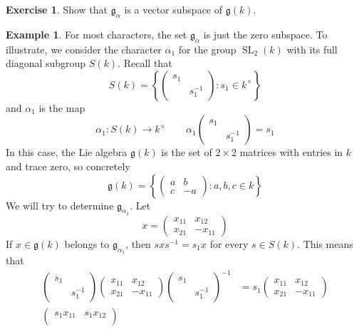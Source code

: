 \documentclass[12pt]{article}
\theoremstyle{definition}
\newtheorem{example}[theorem]{Example}
\newtheorem{exercise}[theorem]{Exercise}
\numberwithin{theorem}{subsection}
\newcommand{\lb}{\left\{}
\newcommand{\rb}{\right\}}
\newcommand{\inv}{^{-1}}
\newcommand{\frakg}{\mathfrak{g}}
\DeclareMathOperator{\SL}{SL}
\begin{document}
\begin{exercise}
Show that $\frakg_\alpha$ is a vector subspace of $\frakg(k)$. 
\end{exercise}

\begin{example}
\label{alpha one}
For most characters, the set $\frakg_\alpha$ is just the zero subspace. To illustrate, we consider the character $\alpha_1$ for the group $\SL_2(k)$ with its full diagonal subgroup $S(k)$. Recall that
\[
	S(k) =
	\lb
		\begin{pmatrix}
			s_1 \\
			& s_1 \inv
		\end{pmatrix}
		: s_1 \in k^\times
	\rb
\]
and $\alpha_1$ is the map
\[
	\alpha_1:S(k) \to k^\times \qquad \alpha_1
		\begin{pmatrix}
			s_1 \\
			& s_1 \inv
		\end{pmatrix}
		= s_1
\]
In this case, the Lie algebra $\frakg(k)$ is the set of $2 \times 2$ matrices with entries in $k$ and trace zero, so concretely
\[
	\frakg(k) =
	\lb
	\begin{pmatrix}
		a & b \\
		c & -a
	\end{pmatrix}
	: a,b,c \in k
	\rb
\]
We will try to determine $\frakg_{\alpha_1}$. Let
\[
	x = 
	\begin{pmatrix}
		x_{11} & x_{12} \\
		x_{21} & -x_{11}
	\end{pmatrix}
\]
If $x \in \frakg(k)$ belongs to $\frakg_{\alpha_1}$, then $sxs \inv = s_1 x$ for every $s \in S(k)$. This means that
\begin{align*}
	\begin{pmatrix}
		s_1 \\
		& s_1 \inv
	\end{pmatrix}
	\begin{pmatrix}
		x_{11} & x_{12} \\
		x_{21} & -x_{11}
	\end{pmatrix}
	\begin{pmatrix}
		s_1 \\
		& s_1 \inv
	\end{pmatrix}
	\inv
	&= s_1
	\begin{pmatrix}
		x_{11} & x_{12} \\
		x_{21} & -x_{11}
	\end{pmatrix} \\
	\begin{pmatrix}
		s_1 x_{11} & s_1 x_{12} \\

\end{pmatrix}
\end{align*}
\end{example}
\end{document}
